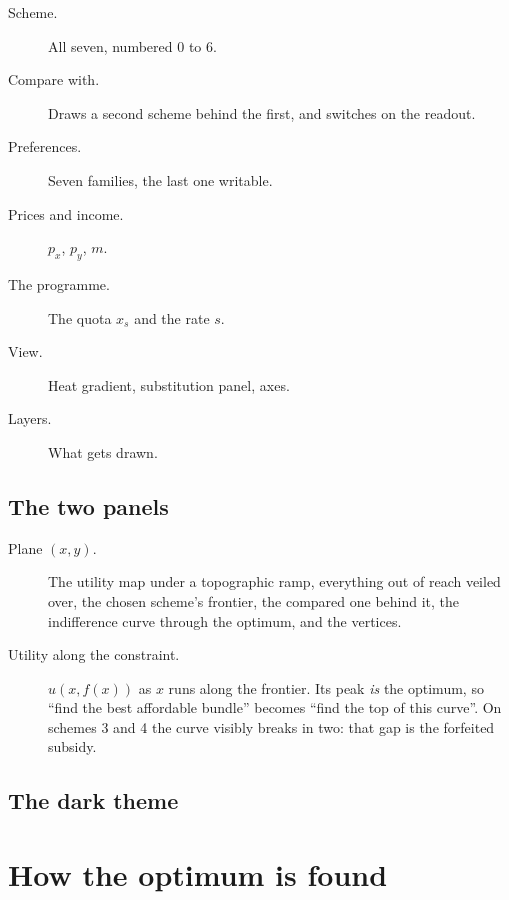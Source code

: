 \documentclass[11pt,a4paper]{appletmanual}
\begin{document}

\begin{description}
\item[Scheme.] All seven, numbered 0 to 6.
\item[Compare with.] Draws a second scheme behind the first, and switches on
  the  readout.
\item[Preferences.] Seven families, the last one writable.
\item[Prices and income.] $p_x$, $p_y$, $m$.
\item[The programme.] The quota $x_s$ and the rate $s$.
\item[View.] Heat gradient, substitution panel, axes.
\item[Layers.] What gets drawn.
\end{description}

\subsection{The two panels}

\begin{description}
\item[Plane $(x, y)$.] The utility map under a topographic ramp, everything out
  of reach veiled over, the chosen scheme's frontier, the compared one behind
  it, the indifference curve through the optimum, and the vertices.
\item[Utility along the constraint.] $u(x, f(x))$ as $x$ runs along the
  frontier. Its peak \emph{is} the optimum, so ``find the best affordable
  bundle'' becomes ``find the top of this curve''. On schemes 3 and 4 the curve
  visibly breaks in two: that gap is the forfeited subsidy.
\end{description}


\subsection{The dark theme}


\section{How the optimum is found}
\end{document}
